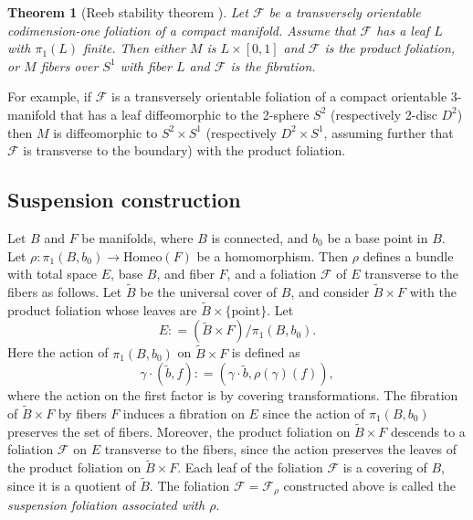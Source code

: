 \documentclass[11pt]{amsart}
\newtheorem{thm}{Theorem}[section]
\theoremstyle{remark}
\theoremstyle{definition}
\begin{document}
	\begin{thm}[Reeb stability theorem \cite{reeb1952certaines}]
		Let $\mathcal{F}$ be a transversely orientable codimension-one foliation of a compact manifold. Assume that $\mathcal{F}$ has a leaf $L$ with $\pi_1(L)$ finite. Then either $M$ is $L \times [0,1]$ and $\mathcal{F}$ is the product foliation, or $M$ fibers over $S^1$ with fiber $L$ and $\mathcal{F}$ is the fibration. 
	\end{thm}

	For example, if $\mathcal{F}$ is a transversely orientable foliation of a compact orientable 3-manifold that has a leaf diffeomorphic to the 2-sphere $S^2$ (respectively 2-disc $D^2$) then $M$ is diffeomorphic to $S^2 \times S^1$ (respectively $D^2 \times S^1$, assuming further that $\mathcal{F}$ is transverse to the boundary) with the product foliation.
	
	\subsection{Suspension construction}
	
	Let $B$ and $F$ be manifolds, where $B$ is connected, and $b_0$ be a base point in $B$. Let $\rho \colon \pi_1(B,b_0) \rightarrow \mathrm{Homeo}(F)$ be a homomorphism. Then $\rho$ defines a bundle with total space $E$, base $B$, and fiber $F$, and a foliation $\mathcal{F}$ of $E$ transverse to the fibers as follows. Let $\tilde{B}$ be the universal cover of $B$, and consider $\tilde{B} \times F$ with the product foliation whose leaves are $\tilde{B} \times \{ \text{point} \}$. Let
	\[ E : = (\tilde{B} \times F)/ \pi_1(B , b_0). \]
	Here the action of $\pi_1(B , b_0)$ on $\tilde{B} \times F$ is defined as 
	\[ \gamma \cdot (\tilde{b} , f) : = (\gamma \cdot \tilde{b}, \rho(\gamma)(f) ), \]
	where the action on the first factor is by covering transformations. The fibration of $\tilde{B} \times F$ by fibers $F$ induces a fibration on $E$ since the action of $\pi_1(B , b_0)$ preserves the set of fibers. Moreover, the product foliation on $\tilde{B} \times F$ descends to a foliation $\mathcal{F}$ on $E$ transverse to the fibers, since the action preserves the leaves of the product foliation on $\tilde{B} \times F$. Each leaf of the foliation $\mathcal{F}$ is a covering of $B$, since it is a quotient of $\tilde{B}$. The foliation $\mathcal{F} = \mathcal{F}_\rho$ constructed above is called the \emph{suspension foliation associated with $\rho$}.
	
\end{document}
